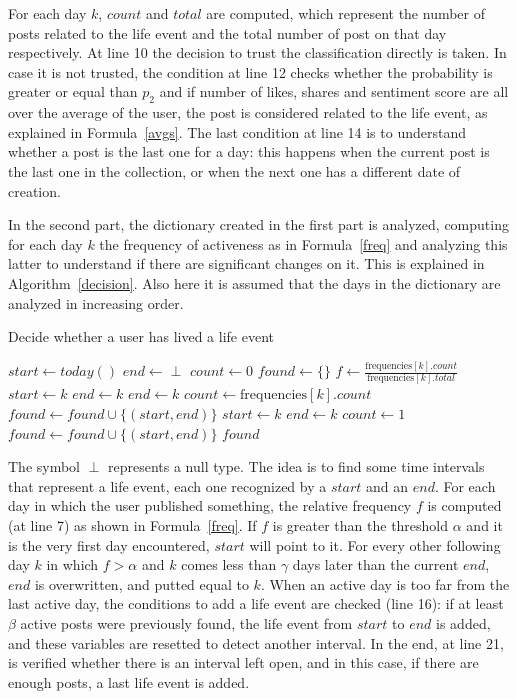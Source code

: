 For each day $k$, $count$ and $total$ are computed, which represent the number of posts related to the life event and the total number of post on that day respectively. At line 10 the decision to trust the classification directly is taken. In case it is not trusted, the condition at line 12 checks whether the probability is greater or equal than $p_2$ and if number of likes, shares and sentiment score are all over the average of the user, the post is considered related to the life event, as explained in Formula~\ref{avgs}. The last condition at line 14 is to understand whether a post is the last one for a day: this happens when the current post is the last one in the collection, or when the next one has a different date of creation.

In the second part, the dictionary created in the first part is analyzed, computing for each day $k$ the frequency of activeness as in Formula~\ref{freq} and analyzing this latter to understand if there are significant changes on it. This is explained in Algorithm~\ref{decision}. Also here it is assumed that the days in the dictionary are analyzed in increasing order.

\begin{algorithm}
\caption{Decide whether a user has lived a life event}
\label{decision}
\begin{algorithmic}[1]
\State $start \gets today()$
\State $end \gets \perp$
\State $count \gets 0$
\State $found \gets \{\}$
	\State $f \gets \frac{\text{frequencies}[k].count}{\text{frequencies}[k].total}$
			\State $start \gets k$
			\State $end \gets k$
		\EndIf
			\State $end \gets k$
			\State $count \gets \text{frequencies}[k].count$
		\Else
				\State $found \gets found \cup \{(start, end)\}$
			\EndIf
			\State $start \gets k$
			\State $end \gets k$
			\State $count \gets 1$
		\EndIf
	\EndIf
\EndFor
{}
	\State $found \gets found \cup \{(start, end)\}$
\EndIf
\Return $found$
\EndFunction
\end{algorithmic}
\end{algorithm}

The symbol $\perp$ represents a null type. The idea is to find some time intervals that represent a life event, each one recognized by a $start$ and an $end$. For each day in which the user published something, the relative frequency $f$ is computed (at line 7) as shown in Formula~\ref{freq}. If $f$ is greater than the threshold $\alpha$ and it is the very first day encountered, $start$ will point to it. For every other following day $k$ in which $f > \alpha$ and $k$ comes less than $\gamma$ days later than the current $end$, $end$ is overwritten, and putted equal to $k$. When an active day is too far from the last active day, the conditions to add a life event are checked (line 16): if at least $\beta$ active posts were previously found, the life event from $start$ to $end$ is added, and these variables are resetted to detect another interval. In the end, at line 21, is verified whether there is an interval left open, and in this case, if there are enough posts, a last life event is added.


